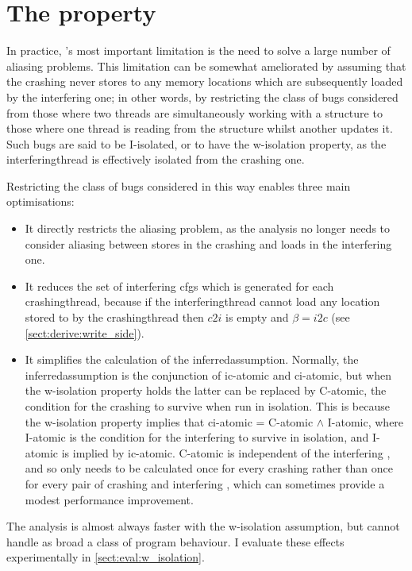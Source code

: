\section{The  property}
\label{sect:derive:w_isolation}

 In practice, {\technique}'s most important limitation is
the need to solve a large number of aliasing problems.  This
limitation can be somewhat ameliorated by assuming that the crashing
{\StateMachine} never stores to any memory locations which are
subsequently loaded by the interfering one; in other words, by
restricting the class of bugs considered from those where two threads
are simultaneously working with a structure to those where one thread
is reading from the structure whilst another updates it.  Such bugs
are said to be I-isolated, or to have the \gls{w-isolation} property,
as the \gls{interferingthread} is effectively isolated from the
crashing one.

Restricting the class of bugs considered in this way enables three
main optimisations:

\begin{itemize}
\item
  It directly restricts the aliasing problem, as the analysis no
  longer needs to consider aliasing between stores in the crashing
  {\StateMachine} and loads in the interfering one.
\item
  It reduces the set of interfering \glspl{cfg} which is generated for
  each \gls{crashingthread}, because if the \gls{interferingthread}
  cannot load any location stored to by the \gls{crashingthread} then
  $c2i$ is empty and $\beta = i2c$ (see
  \autoref{sect:derive:write_side}).
\item
  It simplifies the calculation of the \gls{inferredassumption}.
  Normally, the \gls{inferredassumption} is the conjunction of
  \gls{ic-atomic} and \gls{ci-atomic}, but when the \gls{w-isolation}
  property holds the latter can be replaced by C-atomic, the condition
  for the crashing {\StateMachine} to survive when run in isolation.
  This is because the \gls{w-isolation} property implies that
  \gls{ci-atomic} = C-atomic $\wedge$ I-atomic, where I-atomic is the
  condition for the interfering {\StateMachine} to survive in
  isolation, and I-atomic is implied by \gls{ic-atomic}.  C-atomic is
  independent of the interfering {\StateMachine}, and so only needs to
  be calculated once for every crashing {\StateMachine} rather than
  once for every pair of crashing and interfering {\StateMachines},
  which can sometimes provide a modest performance improvement.
\end{itemize}
The analysis is almost always faster with the \gls{w-isolation}
assumption, but cannot handle as broad a class of program behaviour.
I evaluate these effects experimentally in
\autoref{sect:eval:w_isolation}.

